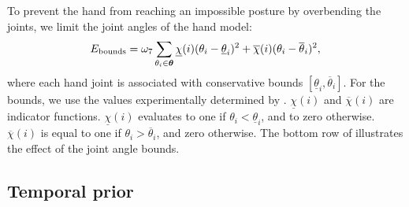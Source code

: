 To prevent the hand from reaching an impossible posture by overbending the joints, we limit the joint angles of the hand model:
\begin{equation}
   E_{\text{bounds}} = \omega_7 \sum_{\theta_i \in \boldsymbol{\theta}}
        \underline{\chi}(i)(\theta_i - \underline{\theta}_i)^2
            +
        \overline{\chi}(i)(\theta_i - \overline{\theta}_i)^2,
        \label{eq:bound}
\end{equation}
%
where each hand joint is associated with conservative bounds $\left[ \underline{\theta}_i,\overline{\theta}_i\right]$. For the bounds, we use the values experimentally determined by \cite{chan1995weighted}.  {$\underline{\chi}(i)$} and {$\overline{\chi}(i)$} are indicator functions. {$\underline{\chi}(i)$} evaluates to one if $\theta_i < \underline{\theta}_i$, and to zero otherwise. $\overline{\chi}(i)$ is equal to one if $\theta_i > \overline{\theta}_i$, and  zero otherwise.
The bottom row of  illustrates the effect of the joint angle bounds.






\subsection*{Temporal prior}

